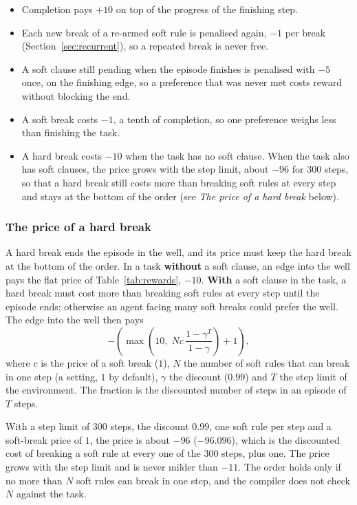 \documentclass[11pt,english,listoffigures,listoftables]{tfgetsinf}
\newcommand{\gain}[1]{\textcolor{green!40!black}{\bfseries\boldmath #1}}  %
\newcommand{\loss}[1]{\textcolor{red!60!black}{\bfseries\boldmath #1}}  %
\begin{document}
\begin{itemize}
    \item Completion pays \gain{$+10$} on top of the progress of the finishing step. 
    \item Each new break of a re-armed soft rule is penalised again, \loss{$-1$} per break (Section~\ref{sec:recurrent}), so a repeated break is never free. 
    \item A soft clause still pending when the episode finishes is penalised with \loss{$-5$} once, on the finishing edge, so a preference that was never met costs reward without blocking the end. 
    \item A soft break costs \loss{$-1$}, a tenth of completion, so one preference weighs less than finishing the task.
    \item A hard break costs \loss{$-10$} when the task has no soft clause. When the task also has soft clauses, the price grows with the step limit, about \loss{$-96$} for 300 steps, so that a hard break still costs more than breaking soft rules at every step and stays at the bottom of the order (see \emph{The price of a hard break} below).
\end{itemize}


\subsubsection{The price of a hard break}
\label{sec:well-charge}
A hard break ends the episode in the well, and its price must keep the hard break at the bottom of the order. In a task \textbf{without} a soft clause, an edge into the well pays the flat price of Table~\ref{tab:rewards}, \loss{$-10$}. \textbf{With} a soft clause in the task, a hard break must cost more than breaking soft rules at every step until the episode ends; otherwise an agent facing many soft breaks could prefer the well. The edge into the well then pays
\[ -\left(\max\!\left(10,\; N c\,\frac{1-\gamma^{T}}{1-\gamma}\right) + 1\right), \]
where $c$ is the price of a soft break ($1$), $N$ the number of soft rules that can break in one step (a setting, $1$ by default), $\gamma$ the discount ($0.99$) and $T$ the step limit of the environment. The fraction is the discounted number of steps in an episode of $T$ steps. 

With a step limit of 300 steps, the discount $0.99$, one soft rule per step and a soft-break price of $1$, the price is about \loss{$-96$} ($-96.096$), which is the discounted cost of breaking a soft rule at every one of the 300 steps, plus one. The price grows with the step limit and is never milder than \loss{$-11$}. The order holds only if no more than $N$ soft rules can break in one step, and the compiler does not check $N$ against the task. 
\end{document}
